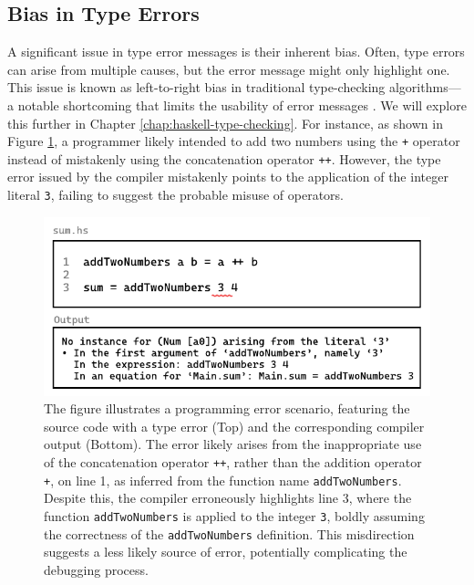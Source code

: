  \subsection{Bias in Type Errors} 
 \label{subsec:bias}
 
A significant issue in type error messages is their inherent bias. Often, type errors can arise from multiple causes, but the error message might only highlight one. This issue is known as left-to-right bias in traditional type-checking algorithms—a notable shortcoming that limits the usability of error messages \cite{McAdam2002-vb, Lee1998-fx, Chen2014-ev}. We will explore this further in Chapter \ref{chap:haskell-type-checking}. For instance, as shown in Figure \ref{fig:type-error-example}, a programmer likely intended to add two numbers using the \texttt{+} operator instead of mistakenly using the concatenation operator \texttt{++}. However, the type error issued by the compiler mistakenly points to the application of the integer literal \texttt{3}, failing to suggest the probable misuse of operators.

 \begin{figure}[]
  \includegraphics[width=\linewidth]{TypeErrorExample}
  \caption[Illustrating a programming error in Haskell, featuring a function named \texttt{addTwoNumbers} with a type error and the corresponding compiler output]{
    \label{fig:type-error-example}
    The figure illustrates a programming error scenario, featuring the source code with a type error (Top) and the corresponding compiler output (Bottom). The error likely arises from the inappropriate use of the concatenation operator \texttt{++}, rather than the addition operator \texttt{+}, on line 1, as inferred from the function name \texttt{addTwoNumbers}. Despite this, the compiler erroneously highlights line 3, where the function \texttt{addTwoNumbers} is applied to the integer \texttt{3}, boldly assuming the correctness of the \texttt{addTwoNumbers} definition. This misdirection suggests a less likely source of error, potentially complicating the debugging process.
    }
\end{figure}


